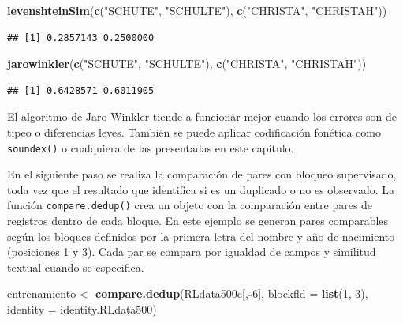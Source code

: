 \documentclass[
  12pt,
]{book}
\newenvironment{Shaded}{\begin{snugshade}}{\end{snugshade}}
\newcommand{\AttributeTok}[1]{\textcolor[rgb]{0.13,0.29,0.53}{#1}}
\newcommand{\DecValTok}[1]{\textcolor[rgb]{0.00,0.00,0.81}{#1}}
\newcommand{\FunctionTok}[1]{\textcolor[rgb]{0.13,0.29,0.53}{\textbf{#1}}}
\newcommand{\NormalTok}[1]{#1}
\newcommand{\OtherTok}[1]{\textcolor[rgb]{0.56,0.35,0.01}{#1}}
\newcommand{\SpecialCharTok}[1]{\textcolor[rgb]{0.81,0.36,0.00}{\textbf{#1}}}
\newcommand{\StringTok}[1]{\textcolor[rgb]{0.31,0.60,0.02}{#1}}
\begin{document}
\begin{Shaded}
\begin{Highlighting}[]
\FunctionTok{levenshteinSim}\NormalTok{(}\FunctionTok{c}\NormalTok{(}\StringTok{"SCHUTE"}\NormalTok{, }\StringTok{"SCHULTE"}\NormalTok{),}
               \FunctionTok{c}\NormalTok{(}\StringTok{"CHRISTA"}\NormalTok{, }\StringTok{"CHRISTAH"}\NormalTok{))}
\end{Highlighting}
\end{Shaded}

\begin{verbatim}
## [1] 0.2857143 0.2500000
\end{verbatim}

\begin{Shaded}
\begin{Highlighting}[]
\FunctionTok{jarowinkler}\NormalTok{(}\FunctionTok{c}\NormalTok{(}\StringTok{"SCHUTE"}\NormalTok{, }\StringTok{"SCHULTE"}\NormalTok{),}
            \FunctionTok{c}\NormalTok{(}\StringTok{"CHRISTA"}\NormalTok{, }\StringTok{"CHRISTAH"}\NormalTok{))}
\end{Highlighting}
\end{Shaded}

\begin{verbatim}
## [1] 0.6428571 0.6011905
\end{verbatim}

El algoritmo de Jaro-Winkler tiende a funcionar mejor cuando los errores son de tipeo o diferencias leves. También se puede aplicar codificación fonética como \texttt{soundex()} o cualquiera de las presentadas en este capítulo.

En el siguiente paso se realiza la comparación de pares con bloqueo supervisado, toda vez que el resultado que identifica si es un duplicado o no es observado. La función \texttt{compare.dedup()} crea un objeto con la comparación entre pares de registros dentro de cada bloque. En este ejemplo se generan pares comparables según los bloques definidos por la primera letra del nombre y año de nacimiento (posiciones 1 y 3). Cada par se compara por igualdad de campos y similitud textual cuando se especifica.

\begin{Shaded}
\begin{Highlighting}[]
\NormalTok{entrenamiento }\OtherTok{\textless{}{-}} \FunctionTok{compare.dedup}\NormalTok{(RLdata500c[,}\SpecialCharTok{{-}}\DecValTok{6}\NormalTok{], }
                               \AttributeTok{blockfld =} \FunctionTok{list}\NormalTok{(}\DecValTok{1}\NormalTok{, }\DecValTok{3}\NormalTok{),  }
                               \AttributeTok{identity =}\NormalTok{ identity.RLdata500)}
\end{Highlighting}
\end{Shaded}
\end{document}
